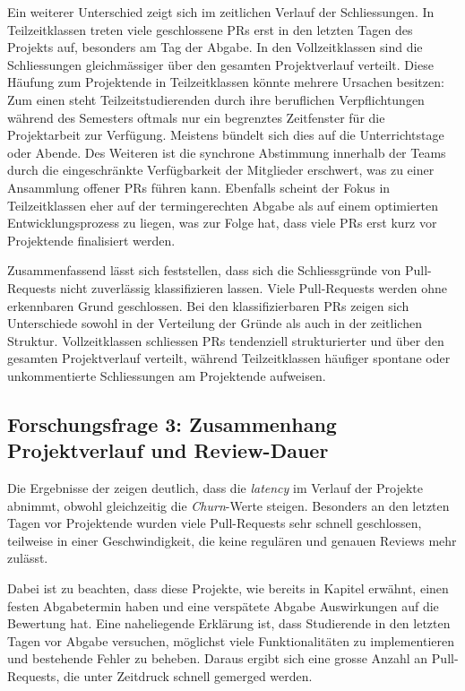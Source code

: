 Ein weiterer Unterschied zeigt sich im zeitlichen Verlauf der Schliessungen. In Teilzeitklassen treten viele geschlossene PRs erst in den letzten Tagen des Projekts auf, besonders am Tag der Abgabe. In den Vollzeitklassen sind die Schliessungen gleichmässiger über den gesamten Projektverlauf verteilt.
Diese Häufung zum Projektende in Teilzeitklassen könnte mehrere Ursachen besitzen: Zum einen steht Teilzeitstudierenden durch ihre beruflichen Verpflichtungen während des Semesters oftmals nur ein begrenztes Zeitfenster für die Projektarbeit zur Verfügung. Meistens bündelt sich dies auf die Unterrichtstage oder Abende. Des Weiteren ist die synchrone Abstimmung innerhalb der Teams durch die eingeschränkte Verfügbarkeit der Mitglieder erschwert, was zu einer Ansammlung offener PRs führen kann. Ebenfalls scheint der Fokus in Teilzeitklassen eher auf der termingerechten Abgabe als auf einem optimierten Entwicklungsprozess zu liegen, was zur Folge hat, dass viele PRs erst kurz vor Projektende finalisiert werden.

Zusammenfassend lässt sich feststellen, dass sich die Schliessgründe von Pull-Re\-quests nicht zuverlässig klassifizieren lassen. Viele Pull-Requests werden ohne erkennbaren Grund geschlossen. Bei den klassifizierbaren PRs zeigen sich Unterschiede sowohl in der Verteilung der Gründe als auch in der zeitlichen Struktur. Vollzeitklassen schliessen PRs tendenziell strukturierter und über den gesamten Projektverlauf verteilt, während Teilzeitklassen häufiger spontane oder unkommentierte Schliessungen am Projektende aufweisen.


\subsection{Forschungsfrage 3: Zusammenhang Projektverlauf und Review-Dauer}
Die Ergebnisse der  zeigen deutlich, dass die \textit{latency} im Verlauf der Projekte abnimmt, obwohl gleichzeitig die \textit{Churn}-Werte steigen. Besonders an den letzten Tagen vor Projektende wurden viele Pull-Requests sehr schnell geschlossen, teilweise in einer Geschwindigkeit, die keine regulären und genauen Reviews mehr zulässt. 

Dabei ist zu beachten, dass diese Projekte, wie bereits in Kapitel  erwähnt, einen festen Abgabetermin haben und eine verspätete Abgabe Auswirkungen auf die Bewertung hat. Eine naheliegende Erklärung ist, dass Studierende in den letzten Tagen vor Abgabe versuchen, möglichst viele Funktionalitäten zu implementieren und bestehende Fehler zu beheben. Daraus ergibt sich eine grosse Anzahl an Pull-Requests, die unter Zeitdruck schnell gemerged werden. 

